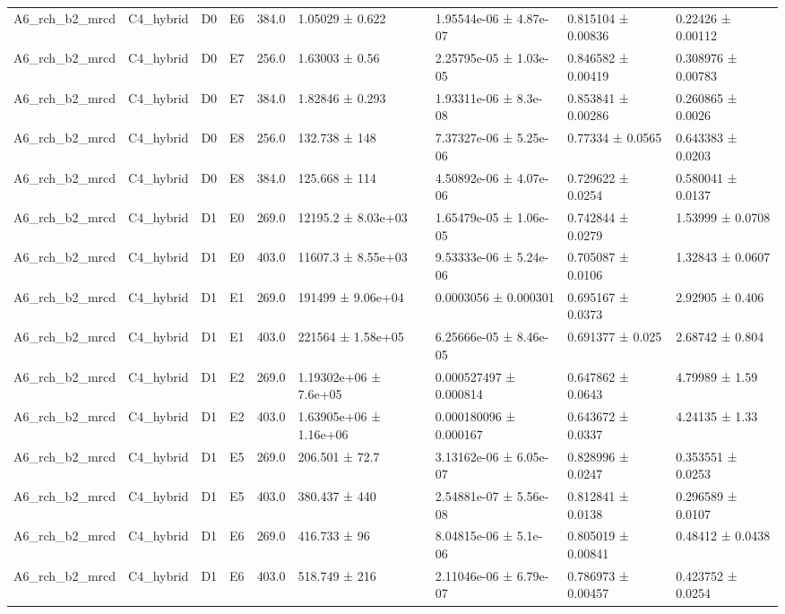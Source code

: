 \begin{table}
\begin{tabular}{lllllllll}
A6\_rch\_b2\_mrcd & C4\_hybrid & D0 & E6 & 384.0 & 1.05029 ± 0.622 & 1.95544e-06 ± 4.87e-07 & 0.815104 ± 0.00836 & 0.22426 ± 0.00112 \\
A6\_rch\_b2\_mrcd & C4\_hybrid & D0 & E7 & 256.0 & 1.63003 ± 0.56 & 2.25795e-05 ± 1.03e-05 & 0.846582 ± 0.00419 & 0.308976 ± 0.00783 \\
A6\_rch\_b2\_mrcd & C4\_hybrid & D0 & E7 & 384.0 & 1.82846 ± 0.293 & 1.93311e-06 ± 8.3e-08 & 0.853841 ± 0.00286 & 0.260865 ± 0.0026 \\
A6\_rch\_b2\_mrcd & C4\_hybrid & D0 & E8 & 256.0 & 132.738 ± 148 & 7.37327e-06 ± 5.25e-06 & 0.77334 ± 0.0565 & 0.643383 ± 0.0203 \\
A6\_rch\_b2\_mrcd & C4\_hybrid & D0 & E8 & 384.0 & 125.668 ± 114 & 4.50892e-06 ± 4.07e-06 & 0.729622 ± 0.0254 & 0.580041 ± 0.0137 \\
A6\_rch\_b2\_mrcd & C4\_hybrid & D1 & E0 & 269.0 & 12195.2 ± 8.03e+03 & 1.65479e-05 ± 1.06e-05 & 0.742844 ± 0.0279 & 1.53999 ± 0.0708 \\
A6\_rch\_b2\_mrcd & C4\_hybrid & D1 & E0 & 403.0 & 11607.3 ± 8.55e+03 & 9.53333e-06 ± 5.24e-06 & 0.705087 ± 0.0106 & 1.32843 ± 0.0607 \\
A6\_rch\_b2\_mrcd & C4\_hybrid & D1 & E1 & 269.0 & 191499 ± 9.06e+04 & 0.0003056 ± 0.000301 & 0.695167 ± 0.0373 & 2.92905 ± 0.406 \\
A6\_rch\_b2\_mrcd & C4\_hybrid & D1 & E1 & 403.0 & 221564 ± 1.58e+05 & 6.25666e-05 ± 8.46e-05 & 0.691377 ± 0.025 & 2.68742 ± 0.804 \\
A6\_rch\_b2\_mrcd & C4\_hybrid & D1 & E2 & 269.0 & 1.19302e+06 ± 7.6e+05 & 0.000527497 ± 0.000814 & 0.647862 ± 0.0643 & 4.79989 ± 1.59 \\
A6\_rch\_b2\_mrcd & C4\_hybrid & D1 & E2 & 403.0 & 1.63905e+06 ± 1.16e+06 & 0.000180096 ± 0.000167 & 0.643672 ± 0.0337 & 4.24135 ± 1.33 \\
A6\_rch\_b2\_mrcd & C4\_hybrid & D1 & E5 & 269.0 & 206.501 ± 72.7 & 3.13162e-06 ± 6.05e-07 & 0.828996 ± 0.0247 & 0.353551 ± 0.0253 \\
A6\_rch\_b2\_mrcd & C4\_hybrid & D1 & E5 & 403.0 & 380.437 ± 440 & 2.54881e-07 ± 5.56e-08 & 0.812841 ± 0.0138 & 0.296589 ± 0.0107 \\
A6\_rch\_b2\_mrcd & C4\_hybrid & D1 & E6 & 269.0 & 416.733 ± 96 & 8.04815e-06 ± 5.1e-06 & 0.805019 ± 0.00841 & 0.48412 ± 0.0438 \\
A6\_rch\_b2\_mrcd & C4\_hybrid & D1 & E6 & 403.0 & 518.749 ± 216 & 2.11046e-06 ± 6.79e-07 & 0.786973 ± 0.00457 & 0.423752 ± 0.0254 \\

\end{tabular}
\end{table}

